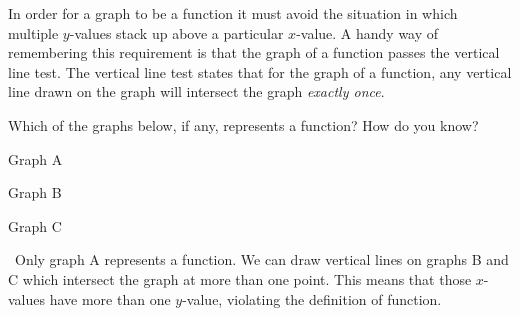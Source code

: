 In order for a graph to be a function it must avoid the situation in which multiple $y$-values stack up above a particular $x$-value. A handy way of remembering this requirement is that the graph of a function passes the \gls{vertical line test}. The vertical line test states that for the graph of a function, any vertical line drawn on the graph will intersect the graph \textit{exactly once}.

\begin{boxex}
Which of the graphs below, if any, represents a function? How do you know?

\begin{minipage}{0.33\textwidth}
\centering
Graph A
\par{}
\end{minipage}
\begin{minipage}{0.33\textwidth}
\centering
Graph B
\par{}
\end{minipage}
\begin{minipage}{0.33\textwidth}
\centering
Graph C
\par{}
\end{minipage}

\exsoln\ Only graph A represents a function. We can draw vertical lines on graphs B and C which intersect the graph at more than one point. This means that those $x$-values have more than one $y$-value, violating the definition of function.
\end{boxex}

